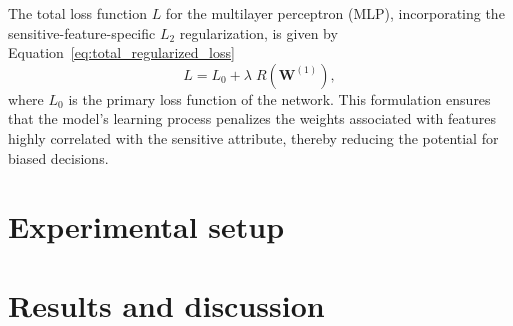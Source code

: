 The total loss function \(L\) for the multilayer perceptron (MLP), incorporating the sensitive-feature-specific \(L_2\) regularization, is given by Equation~\ref{eq:total_regularized_loss}
\begin{equation}\label{eq:total_regularized_loss}
L = L_0 + \lambda \; R(\mathbf{W}^{(1)}),
\end{equation}
where $L_0$ is the primary loss function of the network. This formulation ensures that the model's learning process penalizes the weights associated with features highly correlated with the sensitive attribute, thereby reducing the potential for biased decisions.


\section{Experimental setup}

\section{Results and discussion}
